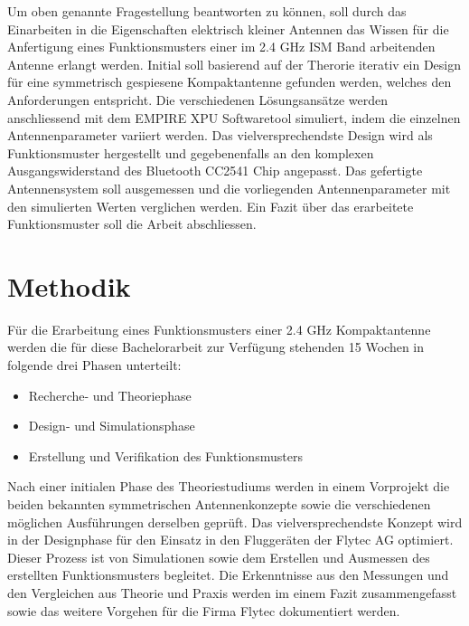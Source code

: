 Um oben genannte Fragestellung beantworten zu können, soll durch das Einarbeiten in die Eigenschaften elektrisch kleiner Antennen das Wissen für die Anfertigung eines Funktionsmusters einer im 2.4 GHz ISM Band arbeitenden Antenne erlangt werden. Initial soll basierend auf der Therorie iterativ ein Design für eine symmetrisch gespiesene Kompaktantenne gefunden werden, welches den Anforderungen entspricht. Die verschiedenen Lösungsansätze werden anschliessend mit dem EMPIRE XPU Softwaretool simuliert, indem die einzelnen Antennenparameter variiert werden. Das vielversprechendste Design wird als Funktionsmuster hergestellt und gegebenenfalls an den komplexen Ausgangswiderstand des Bluetooth CC2541 Chip angepasst. Das gefertigte Antennensystem soll ausgemessen und die vorliegenden Antennenparameter mit den simulierten Werten verglichen werden. Ein Fazit über das erarbeitete Funktionsmuster soll die Arbeit abschliessen.

\section{Methodik}
Für die Erarbeitung eines Funktionsmusters einer 2.4 GHz Kompaktantenne werden die für diese Bachelorarbeit zur Verfügung stehenden 15 Wochen in folgende drei Phasen unterteilt: 
\begin{itemize}
	\item Recherche- und Theoriephase
	\item Design- und Simulationsphase 
	\item  Erstellung und Verifikation des Funktionsmusters
\end{itemize}
Nach einer initialen Phase des Theoriestudiums werden in einem Vorprojekt die beiden bekannten symmetrischen Antennenkonzepte sowie die verschiedenen möglichen Ausführungen derselben geprüft. Das vielversprechendste Konzept wird in der Designphase für den Einsatz in den Fluggeräten der Flytec AG optimiert. Dieser Prozess ist von Simulationen sowie dem  Erstellen und Ausmessen des erstellten Funktionsmusters begleitet. Die Erkenntnisse aus den Messungen und den Vergleichen aus Theorie und Praxis werden im einem Fazit zusammengefasst sowie das weitere Vorgehen für die Firma Flytec dokumentiert werden.



